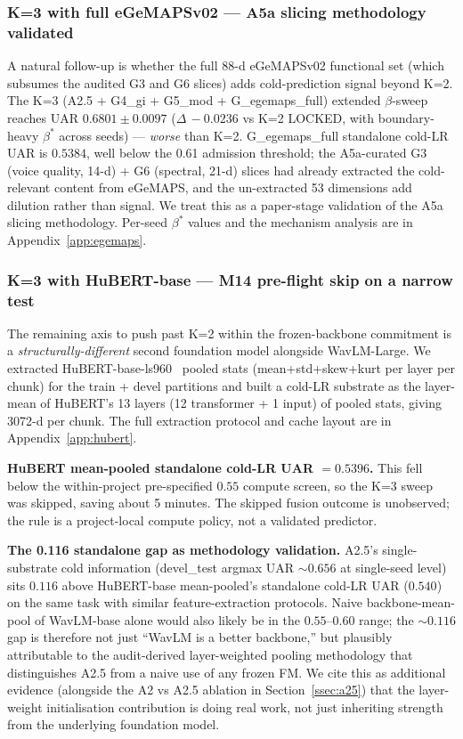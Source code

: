 \subsubsection{K=3 with full eGeMAPSv02 --- A5a slicing methodology validated}

A natural follow-up is whether the full 88-d eGeMAPSv02 functional set (which subsumes the audited G3 and G6 slices) adds cold-prediction signal beyond K=2. The K=3 (A2.5 + G4\_gi + G5\_mod + G\_egemaps\_full) extended $\beta$-sweep reaches UAR $0.6801 \pm 0.0097$ ($\Delta\,-0.0236$ vs K=2 LOCKED, with boundary-heavy $\beta^*$ across seeds) --- \emph{worse} than K=2. G\_egemaps\_full standalone cold-LR UAR is $0.5384$, well below the 0.61 admission threshold; the A5a-curated G3 (voice quality, 14-d) + G6 (spectral, 21-d) slices had already extracted the cold-relevant content from eGeMAPS, and the un-extracted 53 dimensions add dilution rather than signal. We treat this as a paper-stage validation of the A5a slicing methodology. Per-seed $\beta^*$ values and the mechanism analysis are in Appendix~\ref{app:egemaps}.

\subsubsection{K=3 with HuBERT-base --- M14 pre-flight skip on a narrow test}
\label{ssec:k3_hubert}

The remaining axis to push past K=2 within the frozen-backbone commitment is a \emph{structurally-different} second foundation model alongside WavLM-Large. We extracted HuBERT-base-ls960~\cite{hsu2021hubert} pooled stats (mean+std+skew+kurt per layer per chunk) for the train + devel partitions and built a cold-LR substrate as the layer-mean of HuBERT's 13 layers (12 transformer + 1 input) of pooled stats, giving 3072-d per chunk. The full extraction protocol and cache layout are in Appendix~\ref{app:hubert}.

\textbf{HuBERT mean-pooled standalone cold-LR UAR $=0.5396$.} This fell below the within-project pre-specified $0.55$ compute screen, so the K=3 sweep was skipped, saving about 5 minutes. The skipped fusion outcome is unobserved; the rule is a project-local compute policy, not a validated predictor.

\textbf{The 0.116 standalone gap as methodology validation.} A2.5's single-substrate cold information (devel\_test argmax UAR $\sim 0.656$ at single-seed level) sits $0.116$ above HuBERT-base mean-pooled's standalone cold-LR UAR ($0.540$) on the same task with similar feature-extraction protocols. Naive backbone-mean-pool of WavLM-base alone would also likely be in the $0.55$--$0.60$ range; the $\sim 0.116$ gap is therefore not just ``WavLM is a better backbone,'' but plausibly attributable to the audit-derived layer-weighted pooling methodology that distinguishes A2.5 from a naive use of any frozen FM. We cite this as additional evidence (alongside the A2 vs A2.5 ablation in Section~\ref{ssec:a25}) that the layer-weight initialisation contribution is doing real work, not just inheriting strength from the underlying foundation model.

